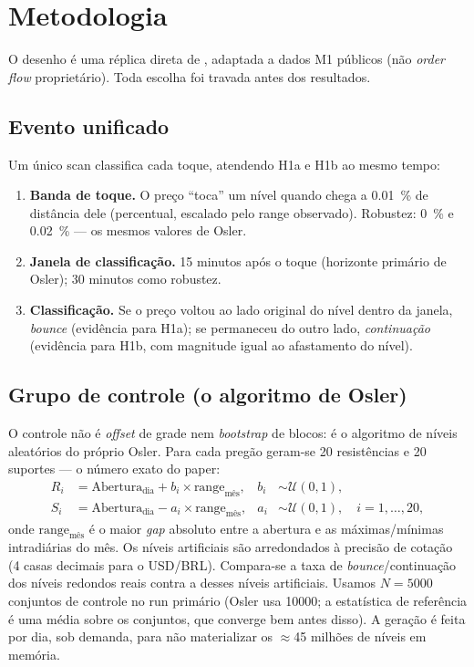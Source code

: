 \documentclass[11pt,a4paper]{article}
\begin{document}
\section{Metodologia}
\label{sec:metodo}

O desenho é uma réplica direta de \citet{osler2000}, adaptada a dados M1 públicos (não
\emph{order flow} proprietário). Toda escolha foi travada antes dos resultados.

\subsection{Evento unificado}

Um único scan classifica cada toque, atendendo H1a e H1b ao mesmo tempo:
\begin{enumerate}
  \item \textbf{Banda de toque.} O preço ``toca'' um nível quando chega a \SI{0.01}{\percent}
  de distância dele (percentual, escalado pelo range observado). Robustez: \SI{0}{\percent} e
  \SI{0.02}{\percent} --- os mesmos valores de Osler.
  \item \textbf{Janela de classificação.} 15 minutos após o toque (horizonte primário de
  Osler); 30 minutos como robustez.
  \item \textbf{Classificação.} Se o preço voltou ao lado original do nível dentro da janela,
  \emph{bounce} (evidência para H1a); se permaneceu do outro lado, \emph{continuação}
  (evidência para H1b, com magnitude igual ao afastamento do nível).
\end{enumerate}

\subsection{Grupo de controle (o algoritmo de Osler)}

O controle não é \emph{offset} de grade nem \emph{bootstrap} de blocos: é o algoritmo de
níveis aleatórios do próprio Osler. Para cada pregão geram-se 20 resistências e 20 suportes
--- o número exato do paper:
\begin{align}
  R_i &= \text{Abertura}_{\text{dia}} + b_i \times \text{range}_{\text{mês}}, &
  b_i &\sim \mathcal{U}(0,1), \\
  S_i &= \text{Abertura}_{\text{dia}} - a_i \times \text{range}_{\text{mês}}, &
  a_i &\sim \mathcal{U}(0,1), \quad i = 1,\dots,20,
\end{align}
onde $\text{range}_{\text{mês}}$ é o maior \emph{gap} absoluto entre a abertura e as
máximas/mínimas intradiárias do mês. Os níveis artificiais são arredondados à precisão de
cotação (4 casas decimais para o USD/BRL). Compara-se a taxa de \emph{bounce}/continuação dos
níveis redondos reais contra a desses níveis artificiais. Usamos $N = \num{5000}$ conjuntos de
controle no run primário (Osler usa \num{10000}; a estatística de referência é uma média
sobre os conjuntos, que converge bem antes disso). A geração é feita por dia, sob demanda,
para não materializar os $\approx$45 milhões de níveis em memória.
\end{document}
